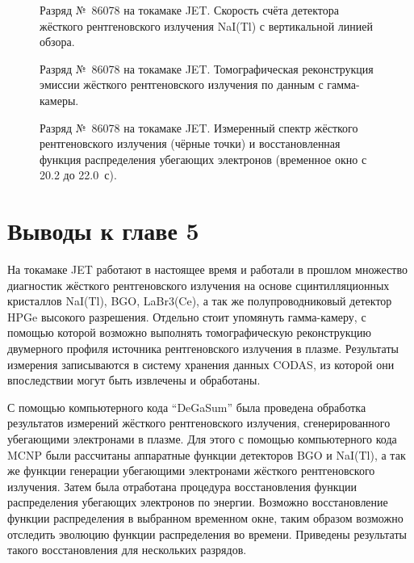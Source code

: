 \begin{figure}[ht!]
  \caption{ Разряд №~86078 на токамаке JET. Скорость счёта детектора жёсткого рентгеновского излучения NaI(Tl) с вертикальной линией обзора.~\cite{Plyusnin2015} }
  \label{fig:jetPulseHxrNaI86078}
\end{figure}

\begin{figure}[ht!]
  \caption{ Разряд №~86078 на токамаке JET. Томографическая реконструкция эмиссии жёсткого рентгеновского излучения по данным с гамма-камеры.~\cite{Plyusnin2015} }
  \label{fig:jetPulseHxrTomography86078}
\end{figure}

\begin{figure}[ht!]
  \caption{ Разряд №~86078 на токамаке JET. Измеренный спектр жёсткого рентгеновского излучения (чёрные точки) и восстановленная функция распределения убегающих электронов (временное окно с 20.2 до 22.0~с).~\cite{Plyusnin2015} }
  \label{fig:jetPulseEdf86078}
\end{figure}


\FloatBarrier
\section{Выводы к главе 5}

На токамаке JET работают в настоящее время и работали в прошлом множество диагностик жёсткого рентгеновского излучения на основе сцинтилляционных кристаллов NaI(Tl), BGO, LaBr3(Ce), а так же полупроводниковый детектор HPGe высокого разрешения. Отдельно стоит упомянуть гамма-камеру, с помощью которой возможно выполнять томографическую реконструкцию двумерного профиля источника рентгеновского излучения в плазме. Результаты измерения записываются в систему хранения данных CODAS, из которой они впоследствии могут быть извлечены и обработаны. 

С помощью компьютерного кода ``DeGaSum'' была проведена обработка результатов измерений жёсткого рентгеновского излучения, сгенерированного убегающими электронами в плазме. Для этого с помощью компьютерного кода MCNP были рассчитаны аппаратные функции детекторов BGO и NaI(Tl), а так же функции генерации убегающими электронами жёсткого рентгеновского излучения. Затем была отработана процедура восстановления функции распределения убегающих электронов по энергии. Возможно восстановление функции распределения в выбранном временном окне, таким образом возможно отследить эволюцию функции распределения во времени. Приведены результаты такого восстановления для нескольких разрядов. 

